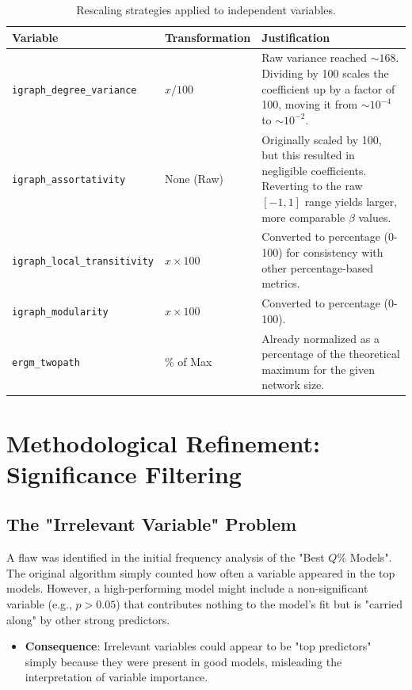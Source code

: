 \documentclass{article}
\begin{document}
\begin{table}[h]
\centering
\begin{tabular}{@{}llp{7cm}@{}}
\toprule
\textbf{Variable} & \textbf{Transformation} & \textbf{Justification} \\ \midrule
\texttt{igraph\_degree\_variance} & $x / 100$ & Raw variance reached $\sim 168$. Dividing by 100 scales the coefficient up by a factor of 100, moving it from $\sim 10^{-4}$ to $\sim 10^{-2}$. \\
\texttt{igraph\_assortativity} & None (Raw) & Originally scaled by 100, but this resulted in negligible coefficients. Reverting to the raw $[-1, 1]$ range yields larger, more comparable $\beta$ values. \\
\texttt{igraph\_local\_transitivity} & $x \times 100$ & Converted to percentage (0-100) for consistency with other percentage-based metrics. \\
\texttt{igraph\_modularity} & $x \times 100$ & Converted to percentage (0-100). \\
\texttt{ergm\_twopath} & \% of Max & Already normalized as a percentage of the theoretical maximum for the given network size. \\
\bottomrule
\end{tabular}
\caption{Rescaling strategies applied to independent variables.}
\end{table}

\section{Methodological Refinement: Significance Filtering}

\subsection{The "Irrelevant Variable" Problem}
A flaw was identified in the initial frequency analysis of the "Best $Q\%$ Models". The original algorithm simply counted how often a variable appeared in the top models. However, a high-performing model might include a non-significant variable (e.g., $p > 0.05$) that contributes nothing to the model's fit but is "carried along" by other strong predictors.
\begin{itemize}
    \item \textbf{Consequence}: Irrelevant variables could appear to be "top predictors" simply because they were present in good models, misleading the interpretation of variable importance.
\end{itemize}
\end{document}
